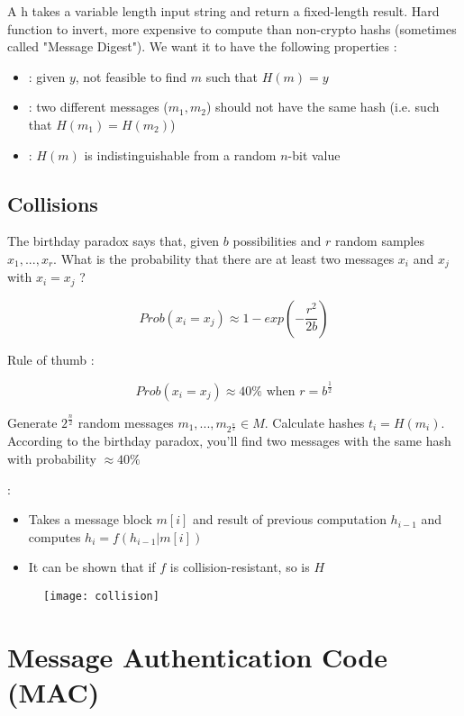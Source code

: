 A h takes a variable length input string and return a fixed-length result. Hard function to invert, more expensive to compute than non-crypto hashs (sometimes called "Message Digest"). We want it to have the following properties :
\begin{itemize}
    \item {} : given $y$, not feasible to find $m$ such that $H(m) = y$
    \item {} : two different messages ($m_1, m_2$) should not have the same hash (i.e. such that $H(m_1) = H(m_2)$)
    \item {} : $H(m)$ is indistinguishable from a random $n$-bit value
\end{itemize}

\subsection{Collisions}

The birthday paradox says that, given $b$ possibilities and $r$ random samples $x_1, ..., x_r$. What is the probability that there are at least two messages $x_i$ and $x_j$ with $x_i = x_j$ ?

\[
Prob(x_i = x_j) \approx 1 - exp(-\frac{r^2}{2b})
\]

Rule of thumb :

\[
Prob(x_i = x_j) \approx 40\% \text{ when } r = b^{\frac{1}{2}}
\]

Generate $2^{\frac{n}{2}}$ random messages $m_1, ..., m_{2^{\frac{n}{2}}} \in M$. Calculate hashes $t_i = H(m_i)$. According to the birthday paradox, you'll find two messages with the same hash with probability $\approx 40\%$

 :
\begin{itemize}
    \item Takes a message block $m[i]$ and result of previous computation $h_{i-1}$ and computes $h_i = f(h_{i-1}|m[i])$
    \item It can be shown that if $f$ is collision-resistant, so is $H$
\end{itemize}

\begin{figure}[H]
    \centering
    \texttt{[image: collision]}
\end{figure}

\newpage
\section{Message Authentication Code (MAC)}

